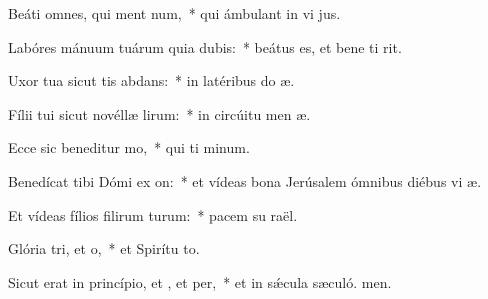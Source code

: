 \item Beáti omnes, qui ment num,~* qui ámbulant in vi jus.
\item Labóres mánuum tuárum quia dubis:~* beátus es, et bene ti rit.
\item Uxor tua sicut tis abdans:~* in latéribus do æ.
\item Fílii tui sicut novéllæ lirum:~* in circúitu men æ.
\item Ecce sic beneditur mo,~* qui ti minum.
\item Benedícat tibi Dómi ex on:~* et vídeas bona Jerúsalem ómnibus diébus vi æ.
\item Et vídeas fílios filirum turum:~* pacem su raël.
\item Glória tri, et o,~* et Spirítu to.
\item Sicut erat in princípio, et , et per,~* et in sǽcula sæculó. men.
